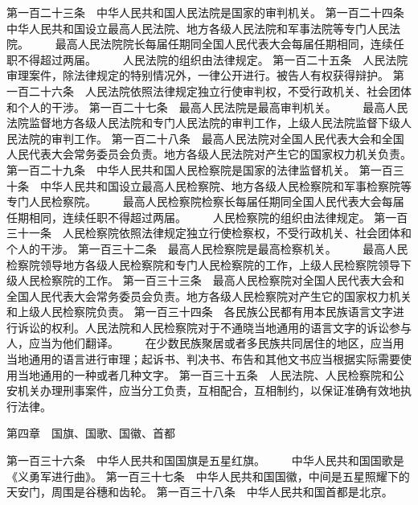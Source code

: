      第一百二十三条　中华人民共和国人民法院是国家的审判机关。
     第一百二十四条　中华人民共和国设立最高人民法院、地方各级人民法院和军事法院等专门人民法院。
　　最高人民法院院长每届任期同全国人民代表大会每届任期相同，连续任职不得超过两届。
　　人民法院的组织由法律规定。
     第一百二十五条　人民法院审理案件，除法律规定的特别情况外，一律公开进行。被告人有权获得辩护。
     第一百二十六条　人民法院依照法律规定独立行使审判权，不受行政机关、社会团体和个人的干涉。
     第一百二十七条　最高人民法院是最高审判机关。
 　　最高人民法院监督地方各级人民法院和专门人民法院的审判工作，上级人民法院监督下级人民法院的审判工作。
     第一百二十八条　最高人民法院对全国人民代表大会和全国人民代表大会常务委员会负责。地方各级人民法院对产生它的国家权力机关负责。
     第一百二十九条　中华人民共和国人民检察院是国家的法律监督机关。
     第一百三十条　中华人民共和国设立最高人民检察院、地方各级人民检察院和军事检察院等专门人民检察院。
　　最高人民检察院检察长每届任期同全国人民代表大会每届任期相同，连续任职不得超过两届。
　　人民检察院的组织由法律规定。
     第一百三十一条　人民检察院依照法律规定独立行使检察权，不受行政机关、社会团体和个人的干涉。
     第一百三十二条　最高人民检察院是最高检察机关。
 　　最高人民检察院领导地方各级人民检察院和专门人民检察院的工作，上级人民检察院领导下级人民检察院的工作。
     第一百三十三条　最高人民检察院对全国人民代表大会和全国人民代表大会常务委员会负责。地方各级人民检察院对产生它的国家权力机关和上级人民检察院负责。
     第一百三十四条　各民族公民都有用本民族语言文字进行诉讼的权利。人民法院和人民检察院对于不通晓当地通用的语言文字的诉讼参与人，应当为他们翻译。
 　　在少数民族聚居或者多民族共同居住的地区，应当用当地通用的语言进行审理；起诉书、判决书、布告和其他文书应当根据实际需要使用当地通用的一种或者几种文字。
     第一百三十五条　人民法院、人民检察院和公安机关办理刑事案件，应当分工负责，互相配合，互相制约，以保证准确有效地执行法律。
     
第四章　国旗、国歌、国徽、首都
     
     第一百三十六条　中华人民共和国国旗是五星红旗。
　　中华人民共和国国歌是《义勇军进行曲》。
     第一百三十七条　中华人民共和国国徽，中间是五星照耀下的天安门，周围是谷穗和齿轮。
     第一百三十八条　中华人民共和国首都是北京。